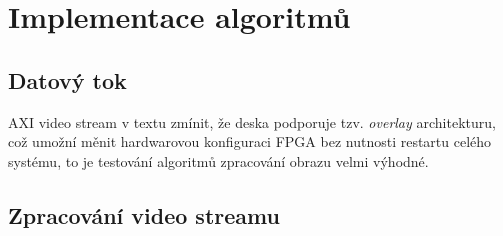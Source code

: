 \documentclass[FM,DP]{tulthesis}
\begin{document}
% 
% 
% 
% 

\chapter{Implementace algoritmů}
\label{kap:implementace}

\section{Datový tok}
AXI video stream v textu zmínit, že deska podporuje tzv. \textit{overlay}
architekturu, což umožní měnit hardwarovou konfiguraci FPGA bez nutnosti
restartu celého systému, to je testování algoritmů zpracování obrazu velmi
výhodné.

\section{Zpracování video streamu}
\end{document}
